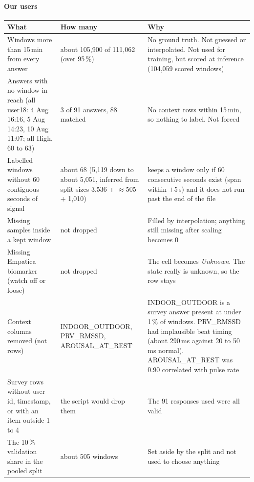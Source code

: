 \documentclass[11pt,a4paper]{article}
\newcommand{\fn}[1]{{\ttfamily\detokenize{#1}}}
\begin{document}
\paragraph{Our users}
\begin{table}[H]
\centering\footnotesize
\begin{tabularx}{\textwidth}{@{}YlY@{}}
\toprule
\textbf{What} & \textbf{How many} & \textbf{Why}\\
\midrule
Windows more than 15\,min from every answer & about 105,900 of 111,062 (over 95\,\%) & No ground truth. Not guessed or interpolated. Not used for training, but scored at inference (104,059 scored windows)\\
Answers with no window in reach (all user18: 4 Aug 16:16, 5 Aug 14:23, 10 Aug 11:07; all High, 60 to 63) & 3 of 91 answers, 88 matched & No context rows within 15\,min, so nothing to label. Not forced\\
Labelled windows without 60 contiguous seconds of signal & about 68 (5,119 down to about 5,051, inferred from split sizes 3,536 + $\approx$505 + 1,010) & \fn{load_windows} keeps a window only if 60 consecutive seconds exist (span within $\pm5$\,s) and it does not run past the end of the file\\
Missing samples inside a kept window & not dropped & Filled by interpolation; anything still missing after scaling becomes 0\\
Missing Empatica biomarker (watch off or loose) & not dropped & The cell becomes \textit{Unknown}. The state really is unknown, so the row stays\\
Context columns removed (not rows) & INDOOR\_OUTDOOR, PRV\_RMSSD, AROUSAL\_AT\_REST & INDOOR\_OUTDOOR is a survey answer present at under 1\,\% of windows. PRV\_RMSSD had implausible beat timing (about 290\,ms against 20 to 50\,ms normal). AROUSAL\_AT\_REST was 0.90 correlated with pulse rate\\
Survey rows without user id, timestamp, or with an item outside 1 to 4 & the script would drop them & The 91 responses used were all valid\\
The 10\,\% validation share in the pooled split & about 505 windows & Set aside by the split and not used to choose anything\\
\bottomrule
\end{tabularx}
\end{table}
\end{document}
